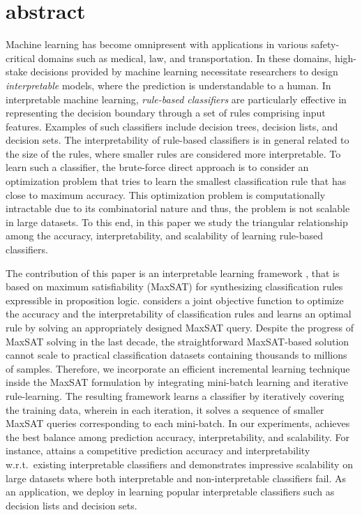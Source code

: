 \section{abstract}
Machine learning has become omnipresent with applications in various safety-critical domains such as medical, law, and transportation. In these domains, high-stake decisions provided by machine learning necessitate researchers to design \emph{interpretable} models, where the prediction is understandable to a human. In interpretable machine learning, \emph{rule-based classifiers} are particularly effective in representing the decision boundary through a set of rules comprising input features. Examples of such classifiers include decision trees, decision lists, and decision sets. The interpretability of rule-based classifiers is in general related to the size of the rules, where smaller rules are considered more interpretable. To learn such a classifier, the brute-force direct approach is to consider an optimization problem 
that tries to learn the smallest classification rule that has close to maximum accuracy. This optimization problem is computationally intractable due to its combinatorial nature and thus, the problem is not scalable in large datasets. To this end, in this paper we study the triangular relationship among the accuracy, interpretability, and scalability of learning rule-based classifiers.

The contribution of this paper is an interpretable learning framework {\imli}, that is based on maximum satisfiability (MaxSAT) for synthesizing classification rules expressible in proposition logic. {\imli} considers a joint objective function to optimize the accuracy and the interpretability of classification rules and learns an optimal rule by solving an appropriately designed MaxSAT query. Despite the progress of MaxSAT solving in the last decade, the straightforward MaxSAT-based solution cannot scale to practical classification datasets containing thousands to millions of samples. Therefore, we incorporate an efficient incremental learning technique inside the MaxSAT formulation by integrating mini-batch learning and iterative rule-learning. The resulting framework learns a classifier by iteratively covering the training data, wherein in each iteration, it solves a sequence of smaller MaxSAT queries corresponding to each mini-batch. In our experiments, {\imli} achieves the best balance among prediction accuracy, interpretability, and scalability. For instance, {\imli} attains a competitive prediction accuracy and interpretability w.r.t.\ existing interpretable classifiers and  demonstrates impressive scalability on large datasets where both interpretable and non-interpretable classifiers fail. As an application, we deploy {\imli} in learning popular interpretable classifiers such as decision lists and decision sets.
